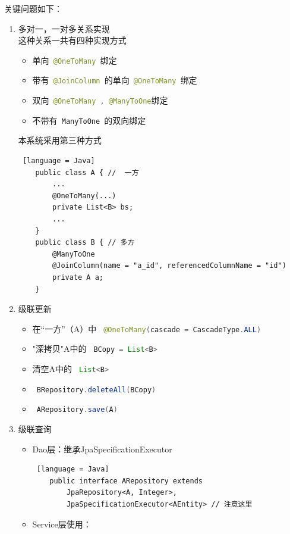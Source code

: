 关键问题如下：

\begin{enumerate}
  \item 多对一，一对多关系实现\\
        这种关系一共有四种实现方式
        \begin{itemize}
          \item 单向\lstinline[language = Java]| @OneToMany |绑定
          \item 带有\lstinline[language = Java]| @JoinColumn |的单向\lstinline[language = Java]| @OneToMany |绑定
          \item 双向\lstinline[language = Java]| @OneToMany , @ManyToOne|绑定
          \item 不带有\lstinline[language = Java]| ManyToOne |的双向绑定
        \end{itemize}
        本系统采用第三种方式
        \begin{lstlisting} [language = Java]
    public class A { //  一方
        ...
        @OneToMany(...)
        private List<B> bs;
        ...
    }
    public class B { // 多方
        @ManyToOne
        @JoinColumn(name = "a_id", referencedColumnName = "id")
        private A a;
    }
\end{lstlisting}
  \item 级联更新
        \begin{itemize}
          \item 在“一方”（A）中 \lstinline[language = Java]| @OneToMany(cascade = CascadeType.ALL) |
          \item "深拷贝"A中的 \lstinline[language = Java]| BCopy = List<B> |
          \item 清空A中的 \lstinline[language = Java]| List<B> |
          \item \lstinline[language = Java]| BRepository.deleteAll(BCopy) |
          \item \lstinline[language = Java]| ARepository.save(A) |
        \end{itemize}
  \item 级联查询
        \begin{itemize}
          \item Dao层：继承JpaSpecificationExecutor
                \begin{lstlisting} [language = Java]
    public interface ARepository extends 
        JpaRepository<A, Integer>, 
        JpaSpecificationExecutor<AEntity> // 注意这里
\end{lstlisting}
          \item Service层使用：

\end{itemize}
\end{enumerate}
